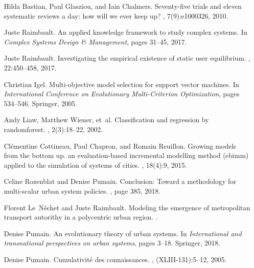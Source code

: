 \documentclass[10pt]{article}
\begin{document}
\begin{thebibliography}{10}
Hilda Bastian, Paul Glasziou, and Iain Chalmers.
\newblock Seventy-five trials and eleven systematic reviews a day: how will we
  ever keep up?
, 7(9):e1000326, 2010.

Juste Raimbault.
\newblock An applied knowledge framework to study complex systems.
\newblock In {\em Complex Systems Design \& Management}, pages 31--45, 2017.

Juste Raimbault.
\newblock Investigating the empirical existence of static user equilibrium.
, 22:450--458, 2017.

Christian Igel.
\newblock Multi-objective model selection for support vector machines.
\newblock In {\em International Conference on Evolutionary Multi-Criterion
  Optimization}, pages 534--546. Springer, 2005.

Andy Liaw, Matthew Wiener, et~al.
\newblock Classification and regression by randomforest.
, 2(3):18--22, 2002.

Cl{\'e}mentine Cottineau, Paul Chapron, and Romain Reuillon.
\newblock Growing models from the bottom up. an evaluation-based incremental
  modelling method (ebimm) applied to the simulation of systems of cities.
, 18(4):9,
  2015.

Celine Rozenblat and Denise Pumain.
\newblock Conclusion: Toward a methodology for multi-scalar urban system
  policies.
,
  page 385, 2018.

Florent Le~N{\'e}chet and Juste Raimbault.
\newblock Modeling the emergence of metropolitan transport autorithy in a
  polycentric urban region.
.

Denise Pumain.
\newblock An evolutionary theory of urban systems.
\newblock In {\em International and transnational perspectives on urban
  systems}, pages 3--18. Springer, 2018.

Denise Pumain.
\newblock Cumulativit{\'e} des connaissances.
, (XLIII-131):5--12, 2005.

\end{thebibliography}
\end{document}
